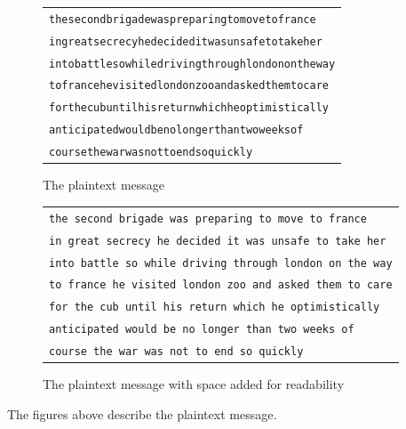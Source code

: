 \documentclass[11pt]{report}
\begin{document}
\begin{figure}[H]
\centering
\begin{tabular}{| l |}
\hline
{\tt thesecondbrigadewaspreparingtomovetofrance}\\
{\tt ingreatsecrecyhedecideditwasunsafetotakeher}\\
{\tt intobattlesowhiledrivingthroughlondonontheway}\\
{\tt tofrancehevisitedlondonzooandaskedthemtocare}\\
{\tt forthecubuntilhisreturnwhichheoptimistically}\\
{\tt anticipatedwouldbenolongerthantwoweeksof}\\
{\tt coursethewarwasnottoendsoquickly}\\
\hline
\end{tabular}
\caption{The plaintext message}
\end{figure}

\begin{figure}[H]
\centering
\begin{tabular}{| l |}
\hline
{\tt the second brigade was preparing to move to france}\\
{\tt in great secrecy he decided it was unsafe to take her}\\
{\tt into battle so while driving through london on the way}\\
{\tt to france he visited london zoo and asked them to care}\\
{\tt for the cub until his return which he optimistically}\\
{\tt anticipated would be no longer than two weeks of}\\
{\tt course the war was not to end so quickly}\\
\hline
\end{tabular}
\caption{The plaintext message with space added for readability}
\end{figure}
The figures above describe the plaintext message.
\end{document}
